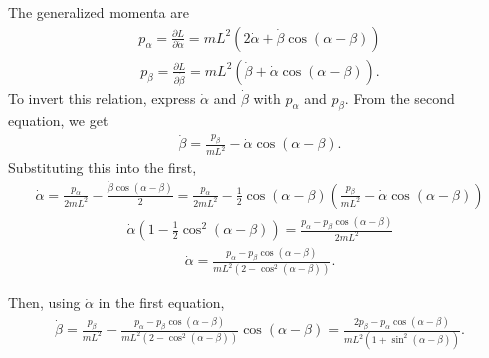 \begin{solution}[8.1]
The generalized momenta are
\begin{align}
p_\alpha = \frac{\partial L}{\partial \dot{\alpha}} = mL^2(2\dot{\alpha} + \dot{\beta}\cos(\alpha - \beta))
\end{align}
\begin{align}
p_\beta = \frac{\partial L}{\partial \dot{\beta}} = mL^2(\dot{\beta} + \dot{\alpha}\cos(\alpha - \beta)).
\end{align}
To invert this relation, express $\dot{\alpha}$ and $\dot{\beta}$ with $p_\alpha$ and $p_{\beta}$.
From the second equation, we get
\begin{align}
\dot{\beta} = \frac{p_\beta}{mL^2} - \dot{\alpha}\cos(\alpha - \beta). 
\end{align}
Substituting this into the first,
\begin{align}
\dot{\alpha} = \frac{p_\alpha}{2mL^2} - \frac{\dot{\beta} \cos(\alpha - \beta) }{2} = \frac{p_\alpha}{2mL^2} - \frac{1}{2}\cos(\alpha-\beta)\left(\frac{p_\beta}{mL^2} - \dot{\alpha}\cos(\alpha - \beta)\right) 
\end{align}
\begin{align}
\dot{\alpha}\left(1 - \frac{1}{2}\cos^2(\alpha - \beta)\right)= \frac{p_\alpha- p_\beta \cos(\alpha-\beta)}{2mL^2} 
\end{align}
\begin{align}
\dot{\alpha} = \frac{p_\alpha- p_\beta \cos(\alpha-\beta)}{mL^2(2-\cos^2(\alpha - \beta))}.
\end{align}

Then, using $\dot{\alpha}$ in the first equation,
\begin{align}
\dot{\beta} = \frac{p_\beta}{mL^2} -  \frac{p_\alpha- p_\beta \cos(\alpha-\beta)}{mL^2(2-\cos^2(\alpha - \beta))}\cos(\alpha - \beta) = \frac{2p_\beta - p_\alpha \cos(\alpha-\beta)}{mL^2(1+\sin^2(\alpha - \beta))}. 
\end{align}


\end{solution}
